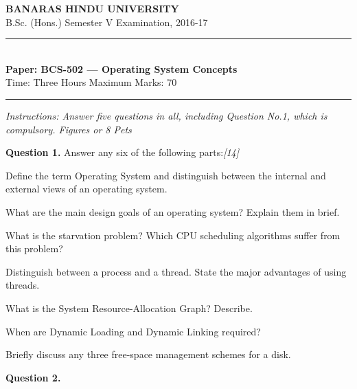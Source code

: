\documentclass[11pt,a4paper]{article}
\newcommand{\pts}[1]{\hfill   \textit{[#1]}}
\begin{document}
\begin{center}
  {\large\bfseries BANARAS HINDU UNIVERSITY}\\[2pt]
  {\normalsize B.Sc. (Hons.) Semester V Examination, 2016-17}\\[6pt]
  \rule{0.8\linewidth}{0.5pt}\\[6pt]
  {\large\bfseries Paper: BCS-502 --- Operating System Concepts}\\[4pt]
  {\normalsize Time: Three Hours \hfill Maximum Marks: 70}
\end{center}

\rule{\linewidth}{0.4pt}

\smallskip



\noindent   \textit{Instructions: Answer five questions in all, including Question No.1, which is compulsory. Figures or 8 Pets}

\bigskip

\medskip


\noindent   \textbf{Question 1.} Answer any six of the following parts:\pts{14}

\begin{parts}
  \item Define the term Operating System and distinguish between the internal and external views of an operating system.
  \item What are the main design goals of an operating system? Explain them in brief.
  \item What is the starvation problem? Which CPU scheduling algorithms suffer from this problem?
  \item Distinguish between a process and a thread. State the major advantages of using threads.
  \item What is the System Resource-Allocation Graph? Describe.
  \item When are Dynamic Loading and Dynamic Linking required?
  \item Briefly discuss any three free-space management schemes for a disk.
\end{parts}

\medskip


\noindent   \textbf{Question 2.}
\end{document}
